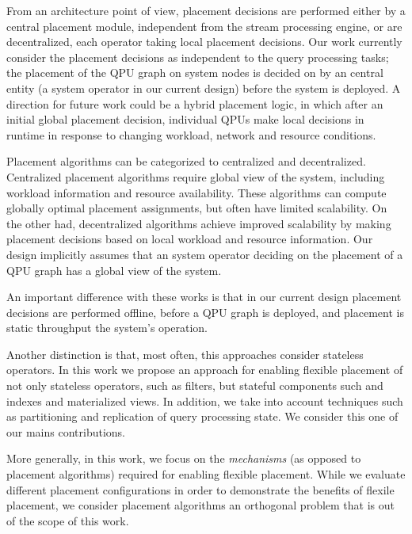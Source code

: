 From an architecture point of view, placement decisions are performed either by a central placement module, independent
from the stream processing engine, or are decentralized, each operator taking local placement decisions.
Our work currently consider the placement decisions as independent to the query processing tasks;
the placement of the QPU graph on system nodes is decided on by an central entity (a system operator in our current design)
before the system is deployed.
A direction for future work could be a hybrid placement logic, in which after an initial global placement decision,
individual QPUs make local decisions in runtime in response to changing workload, network and resource conditions.

Placement algorithms can be categorized to centralized and decentralized.
Centralized placement algorithms require global view of the system, including workload information and resource availability.
These algorithms can compute globally optimal placement assignments, but often have limited scalability.
On the other had, decentralized algorithms achieve improved scalability by making placement decisions based on local
workload and resource information.
Our design implicitly assumes that an system operator deciding on the placement of a QPU graph has a global view of the
system.

An important difference with these works is that in our current design placement decisions are performed offline,
before a QPU graph is deployed, and placement is static throughput the system's operation.

Another distinction is that, most often, this approaches consider stateless operators.
In this work we propose an approach for enabling flexible placement of not only stateless operators, such as
filters, but stateful components such and indexes and materialized views.
In addition, we take into account techniques such as partitioning and replication of query processing state.
We consider this one of our mains contributions.

More generally, in this work, we focus on the \textit{mechanisms} (as opposed to placement algorithms)
required for enabling flexible placement.
While we evaluate different placement configurations in order to demonstrate the benefits of flexile placement,
we consider placement algorithms an orthogonal problem that is out of the scope of this work.


